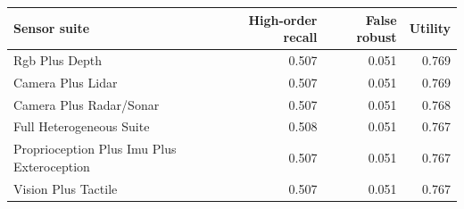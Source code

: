 \begin{tabular}{lrrr}
\toprule
Sensor suite & High-order recall & False robust & Utility \\
\midrule
Rgb Plus Depth & 0.507 & 0.051 & 0.769 \\
Camera Plus Lidar & 0.507 & 0.051 & 0.769 \\
Camera Plus Radar/Sonar & 0.507 & 0.051 & 0.768 \\
Full Heterogeneous Suite & 0.508 & 0.051 & 0.767 \\
Proprioception Plus Imu Plus Exteroception & 0.507 & 0.051 & 0.767 \\
Vision Plus Tactile & 0.507 & 0.051 & 0.767 \\
\bottomrule
\end{tabular}
